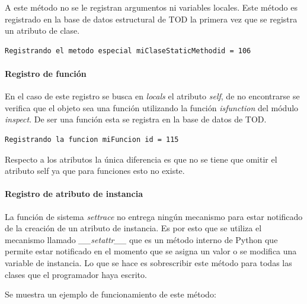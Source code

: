 \documentclass[12pt,legalpaper]{report}
\begin{document}
A este método no se le registran argumentos ni variables locales.  Este método es registrado en la base de datos estructural de TOD la primera vez que se registra un atributo de clase.

\begin{singlespace}
\begin{lstlisting}[style=consola,numbers=none]
Registrando el metodo especial miClaseStaticMethodid = 106
\end{lstlisting}
\end{singlespace}

				
				\paragraph{Registro de función}
				
En el caso de este registro se busca en \textit{locals} el atributo \textit{self}, de no encontrarse se verifica que el objeto sea una función utilizando la función \textit{isfunction} del módulo \textit{inspect}.  De ser una función esta se registra en la base de datos de TOD.			

\begin{singlespace}
\begin{lstlisting}[style=consola,numbers=none]
Registrando la funcion miFuncion id = 115
\end{lstlisting}
\end{singlespace}

Respecto a los atributos la única diferencia es que no se tiene que omitir el atributo self ya que para funciones esto no existe.


				\paragraph{Registro de atributo de instancia\label{registerField}}

La función de sistema \textit{settrace} no entrega ningún mecanismo para estar notificado de la creación de un atributo de instancia.  Es por esto que se utiliza el mecanismo llamado \textit{\_\_setattr\_\_} que es un método interno de Python \cite{setattr} que permite estar notificado en el momento que se asigna un valor o se modifica una variable de instancia.  Lo que se hace es sobrescribir este método para todas las clases que el programador haya escrito.

Se muestra un ejemplo de funcionamiento de este método:
\end{document}
